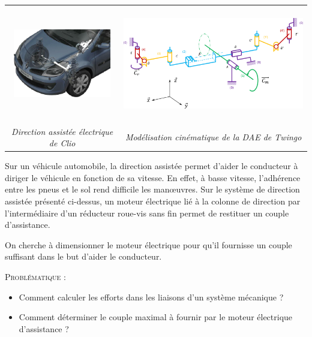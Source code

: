\documentclass[10pt]{article}
\begin{document}





\begin{center}
\begin{tabular}{cc}
\includegraphics[height=3cm]{images/dae_renault} &
\includegraphics[height=5cm]{images/schema} \\
\textit{Direction assistée électrique de Clio \cite{clio}} & \textit{Modélisation cinématique de la DAE de Twingo}\\
\end{tabular}
\end{center}

\vspace{.2cm}

Sur un véhicule automobile, la direction assistée permet d'aider le conducteur à diriger le véhicule en fonction de sa vitesse. En effet, à basse vitesse, l'adhérence entre les pneus et le sol rend difficile les manœuvres. Sur le système de direction assistée présenté ci-dessus, un moteur électrique lié à la colonne de direction par l'intermédiaire d'un réducteur roue-vis sans fin permet de restituer un couple d'assistance. 

On cherche à dimensionner le moteur électrique pour qu'il fournisse un couple suffisant dans le but d'aider le conducteur. 

\begin{prob}
\textsc{Problématique :}
\begin{itemize}
\item Comment calculer les efforts dans les liaisons d'un système mécanique ?
\item Comment déterminer le couple maximal à fournir par le moteur électrique d'assistance ?
\end{itemize}
\end{prob}
\end{document}
